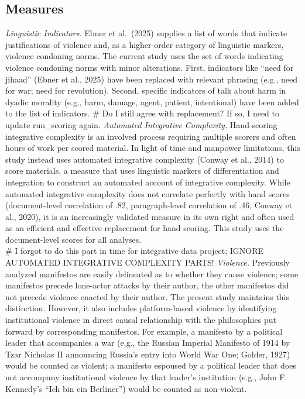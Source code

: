 \documentclass[
  english,
  man]{apa6}
\begin{document}
\subsection{Measures}\label{measures}

\emph{Linguistic Indicators.} Ebner et al.~(2025) supplies a list of words that indicate
justifications of violence and, as a higher-order category of linguistic markers, violence
condoning norms. The current study uses the set of words indicating violence condoning
norms with minor alterations. First, indicators like ``need for jihaad'' (Ebner et al., 2025)
have been replaced with relevant phrasing (e.g., need for war; need for revolution). Second,
specific indicators of talk about harm in dyadic morality (e.g., harm, damage, agent,
patient, intentional) have been added to the list of indicators.
\#\textbar{} Do I still agree with replacement? If so, I need to update run\_scoring again.
\emph{Automated Integrative Complexity.} Hand-scoring integrative complexity is an involved
process requiring multiple scorers and often hours of work per scored material. In light of
time and manpower limitations, this study instead uses automated integrative complexity
(Conway et al., 2014) to score materials, a measure that uses linguistic markers of
differentiation and integration to construct an automated account of integrative complexity.
While automated integrative complexity does not correlate perfectly with hand scores
(document-level correlation of .82, paragraph-level correlation of .46, Conway et al.,
2020), it is an increasingly validated measure in its own right and often used as an
efficient and effective replacement for hand scoring. This study uses the document-level
scores for all analyses.\\
\#\textbar{} I forgot to do this part in time for integrative data project; IGNORE AUTOMATED INTEGRATIVE COMPLEXITY PARTS!
\emph{Violence.} Previously analyzed manifestos are easily delineated as to whether they cause
violence; some manifestos precede lone-actor attacks by their author, the other manifestos
did not precede violence enacted by their author. The present study maintains this
distinction. However, it also includes platform-based violence by identifying institutional
violence in direct causal relationship with the philosophies put forward by corresponding
manifestos. For example, a manifesto by a political leader that accompanies a war (e.g., the
Russian Imperial Manifesto of 1914 by Tzar Nicholas II announcing Russia's entry into World
War One; Golder, 1927) would be counted as violent; a manifesto espoused by a political
leader that does not accompany institutional violence by that leader's institution (e.g.,
John F. Kennedy's ``Ich bin ein Berliner'') would be counted as non-violent.
\end{document}
